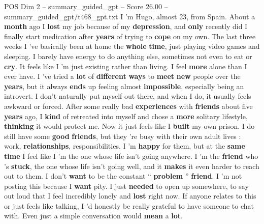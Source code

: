 \begin{textsample}{POS Dim 2 – summary\_guided\_gpt – Score 26.00 – summary\_guided\_gpt/t468\_gpt.txt}  \label{ex:f2_pos_002}
I ’m Hugo, almost 23, from Spain.
About a \textbf{month} ago I \textbf{lost} my job because of my \textbf{depression}, and \textbf{only} recently did I finally start medication after \textbf{years} of trying to \textbf{cope} on my own.
The last three weeks I ’ve basically been at home the \textbf{whole} \textbf{time}, just playing video games and sleeping.
I barely have energy to do anything else, sometimes not even to eat or \textbf{cry}.
It feels like I ’m just existing rather than living.
I feel \textbf{more} alone than I ever have.
I ’ve tried a \textbf{lot} of \textbf{different} \textbf{ways} to \textbf{meet} \textbf{new} people over the \textbf{years}, but it always \textbf{ends} up feeling almost \textbf{impossible}, especially being an introvert.
I don't naturally put myself out there, and when I do, it usually feels awkward or forced.
After some really bad \textbf{experiences} with \textbf{friends} about five \textbf{years} ago, I \textbf{kind} of retreated into myself and chose a \textbf{more} solitary lifestyle, \textbf{thinking} it would protect me.
Now it just feels like I \textbf{built} my own prison.
I do still have some \textbf{good} \textbf{friends}, but they ’re busy with their own adult lives : work, \textbf{relationships}, responsibilities.
I ’m \textbf{happy} for them, but at the \textbf{same} \textbf{time} I feel like I ’m the one whose life isn't going anywhere.
I ’m the \textbf{friend} who ’s \textbf{stuck}, the one whose life isn't going well, and it \textbf{makes} it even harder to reach out to them.
I don't \textbf{want} to be the constant “ \textbf{problem} ” \textbf{friend}.
I ’m not posting this because I \textbf{want} pity.
I just \textbf{needed} to open up somewhere, to say out loud that I feel incredibly lonely and \textbf{lost} right now.
If anyone relates to this or just feels like talking, I ’d honestly be really grateful to have someone to chat with.
Even just a simple conversation would \textbf{mean} a \textbf{lot}.

\end{textsample}

